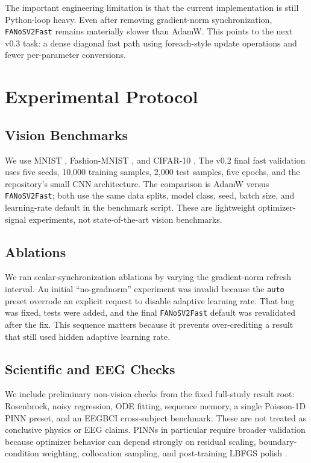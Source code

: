 \documentclass[11pt]{article}
\begin{document}
The important engineering limitation is that the current implementation is still Python-loop heavy. Even after removing gradient-norm synchronization, \texttt{FANoSV2Fast} remains materially slower than AdamW. This points to the next v0.3 task: a dense diagonal fast path using foreach-style update operations and fewer per-parameter conversions.

\section{Experimental Protocol}

\subsection{Vision Benchmarks}

We use MNIST \cite{lecun1998mnist}, Fashion-MNIST \cite{xiao2017fashion}, and CIFAR-10 \cite{krizhevsky2009cifar}. The v0.2 final fast validation uses five seeds, 10,000 training samples, 2,000 test samples, five epochs, and the repository's small CNN architecture. The comparison is AdamW versus \texttt{FANoSV2Fast}; both use the same data splits, model class, seed, batch size, and learning-rate default in the benchmark script. These are lightweight optimizer-signal experiments, not state-of-the-art vision benchmarks.

\subsection{Ablations}

We ran scalar-synchronization ablations by varying the gradient-norm refresh interval. An initial ``no-gradnorm'' experiment was invalid because the \texttt{auto} preset overrode an explicit request to disable adaptive learning rate. That bug was fixed, tests were added, and the final \texttt{FANoSV2Fast} default was revalidated after the fix. This sequence matters because it prevents over-crediting a result that still used hidden adaptive learning rate.

\subsection{Scientific and EEG Checks}

We include preliminary non-vision checks from the fixed full-study result root: Rosenbrock, noisy regression, ODE fitting, sequence memory, a single Poisson-1D PINN preset, and an EEGBCI cross-subject benchmark. These are not treated as conclusive physics or EEG claims. PINNs in particular require broader validation because optimizer behavior can depend strongly on residual scaling, boundary-condition weighting, collocation sampling, and post-training LBFGS polish \cite{raissi2019pinn}.
\end{document}
